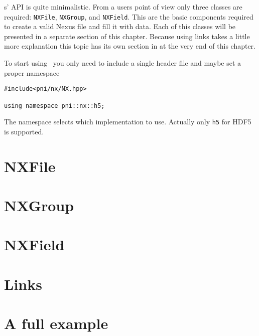 
\pninx s' API is quite minimalistic. From a users point of view only 
three classes are required: {\tt NXFile}, {\tt NXGroup}, and {\tt NXField}.
This are the basic components required to create a valid Nexus file and 
fill it with data. Each of this classes will be presented in a separate 
section of this chapter. 
Because using links takes a little more explanation this topic has 
its own section in at the very end of this chapter.

To start using \pninx\ you only need to include a single header file 
and maybe set a proper namespace
\begin{verbatim}
#include<pni/nx/NX.hpp>

using namespace pni::nx::h5;
\end{verbatim}

The namespace selects which implementation to use. Actually only {\tt h5} for
HDF5 is supported.

\section{NXFile}\label{section:nxfile}


\section{NXGroup}\label{section:nxgroup}


\section{NXField}\label{section:nxfield}


\section{Links}\label{section:links}

\section{A full example}\label{section:full_example}
